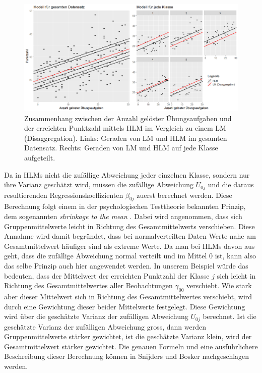 \documentclass[12pt]{article}\usepackage[]{graphicx}\usepackage[]{color}
\begin{document}
\begin{figure}[ht!]
\centering
\includegraphics[width = \textwidth]{random_intercept}
\caption{Zusammenhang zwischen der Anzahl gelöster Übungsaufgaben und der erreichten Punktzahl mittels HLM im Vergleich zu einem LM (Disaggregation). Links: Geraden von LM und HLM im gesamten Datensatz. Rechts: Geraden von LM und HLM auf jede Klasse aufgeteilt.}
\label{fig:random_intercept}
\end{figure}

Da in HLMs nicht die zufällige Abweichung jeder einzelnen Klasse, sondern nur ihre Varianz geschätzt wird, müssen die zufällige Abweichung $U_{0j}$ und die daraus resultierenden Regressionskoeffizienten $\beta_{0j}$ zuerst berechnet werden. Diese Berechnung folgt einem in der psychologischen Testtheorie bekannten Prinzip, dem sogenannten \textit{shrinkage to the mean} \citep{SnijdersTomA.B2012Ma:a}. Dabei wird angenommen, dass sich Gruppenmittelwerte leicht in Richtung des Gesamtmittelwerts verschieben. Diese Annahme wird damit begründet, dass bei normalverteilten Daten Werte nahe am Gesamtmittelwert häufiger sind als extreme Werte. Da man bei HLMs davon aus geht, dass die zufällige Abweichung normal verteilt und im Mittel 0 ist, kann also das selbe Prinzip auch hier angewendet werden. In unserem Beispiel würde das bedeuten, dass der Mittelwert der erreichten Punktzahl der Klasse $j$ sich leicht in Richtung des Gesamtmittelwertes aller Beobachtungen $\gamma_{00}$ verschiebt. Wie stark aber dieser Mittelwert sich in Richtung des Gesamtmittelwertes verschiebt, wird durch eine Gewichtung dieser beider Mittelwerte festgelegt. Diese Gewichtung wird über die geschätzte Varianz der zufälligen Abweichung $U_{0j}$ berechnet. Ist die geschätzte Varianz der zufälligen Abweichung gross, dann werden Gruppenmittelwerte stärker gewichtet, ist die geschätzte Varianz klein, wird der Gesamtmittelwert stärker gewichtet. Die genauen Formeln und eine ausführlichere Beschreibung dieser Berechnung können in Snijders und Bosker \citeyearpar[][Abschnitt 4.8]{SnijdersTomA.B2012Ma:a} nachgeschlagen werden.
\end{document}
